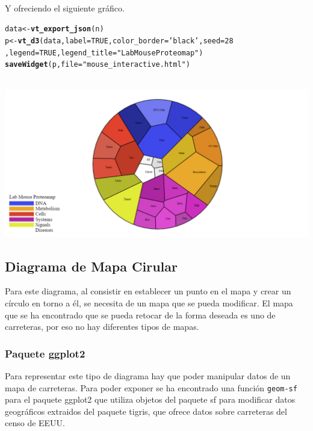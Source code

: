 \documentclass{article}\usepackage[]{graphicx}\usepackage[]{color}
\makeatletter
\newcommand{\hlnum}[1]{\textcolor[rgb]{0.686,0.059,0.569}{#1}}%
\newcommand{\hlstr}[1]{\textcolor[rgb]{0.192,0.494,0.8}{#1}}%
\newcommand{\hlstd}[1]{\textcolor[rgb]{0.345,0.345,0.345}{#1}}%
\newcommand{\hlkwb}[1]{\textcolor[rgb]{0.69,0.353,0.396}{#1}}%
\newcommand{\hlkwc}[1]{\textcolor[rgb]{0.333,0.667,0.333}{#1}}%
\newcommand{\hlkwd}[1]{\textcolor[rgb]{0.737,0.353,0.396}{\textbf{#1}}}%
\newenvironment{kframe}{%
 \def\at@end@of@kframe{}%
 \ifinner\ifhmode%
  \def\at@end@of@kframe{\end{minipage}}%
  \begin{minipage}{\columnwidth}%
 \fi\fi%
 \def\FrameCommand##1{\hskip\@totalleftmargin \hskip-\fboxsep
 \colorbox{shadecolor}{##1}\hskip-\fboxsep
     \hskip-\linewidth \hskip-\@totalleftmargin \hskip\columnwidth}%
 \MakeFramed {\advance\hsize-\width
   \@totalleftmargin\z@ \linewidth\hsize
   \@setminipage}}%
 {\par\unskip\endMakeFramed%
 \at@end@of@kframe}
\newenvironment{knitrout}{}{} %
\makeatother
\begin{document}
~\\
Y ofreciendo el siguiente gr\'afico.
\begin{knitrout}
\color{fgcolor}\begin{kframe}
\begin{alltt}
\hlstd{data}\hlkwb{<-}\hlkwd{vt_export_json}\hlstd{(n)}
\hlstd{p} \hlkwb{<-} \hlkwd{vt_d3}\hlstd{(data,} \hlkwc{label} \hlstd{=} \hlnum{TRUE}\hlstd{,}\hlkwc{color_border} \hlstd{=} \hlstr{'black'}\hlstd{,} \hlkwc{seed} \hlstd{=} \hlnum{28}
      \hlstd{,} \hlkwc{legend} \hlstd{=} \hlnum{TRUE}\hlstd{,} \hlkwc{legend_title} \hlstd{=} \hlstr{"Lab Mouse Proteomap"}\hlstd{)}
\hlkwd{saveWidget}\hlstd{(p,} \hlkwc{file} \hlstd{=} \hlstr{"mouse_interactive.html"}\hlstd{)}
\end{alltt}
\end{kframe}
\end{knitrout}
~\\
\vbox{
    \centering
    \includegraphics[width=1.2\textwidth]{imag/mouse_interactive}
}
\clearpage
\subsection{Diagrama de Mapa Cirular}\label{ssec:carretera}
Para este diagrama, al consistir en establecer un punto en el mapa y crear un c\'irculo en torno a \'el, se necesita de un mapa que se pueda modificar. El mapa que se ha encontrado que se pueda retocar de la forma deseada es uno de carreteras, por eso no hay diferentes tipos de mapas.
\subsubsection{Paquete ggplot2}
Para representar este tipo de diagrama hay que poder manipular datos de un mapa de carreteras. Para poder exponer se ha encontrado una funci\'on \texttt{geom-sf} para el paquete ggplot2\cite{docu_ggplot2} que utiliza objetos del paquete sf para modificar datos geogr\'aficos extraidos del paquete tigris\cite{docu_tigris}, que ofrece datos sobre carreteras del censo de EEUU.  
\end{document}
